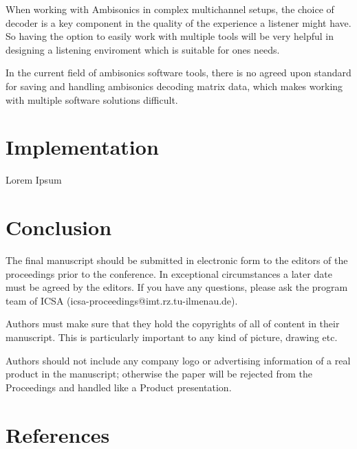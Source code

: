 \documentclass[a4paper, 10pt, twocolumn]{article}
\begin{document}
When working with Ambisonics in complex multichannel setups, the choice of decoder is a key component in the quality of the experience a listener might have. So having the option to easily work with multiple tools will be very helpful in designing a listening enviroment which is suitable for ones needs.

In the current field of ambisonics software tools, there is no agreed upon standard for saving and handling ambisonics decoding matrix data, which makes working with multiple software solutions difficult. 

\section{Implementation} \label{sec:Implementation}

Lorem Ipsum


\section{Conclusion }
The final manuscript should be submitted in electronic form to the editors of the proceedings prior to the conference. In exceptional circumstances a later date must be agreed by the editors. If you have any questions, please ask the program team of ICSA (icsa-proceedings@imt.rz.tu-ilmenau.de).

Authors must make sure that they hold the copyrights of all of content in their manuscript. This is particularly important to any kind of picture, drawing etc.

Authors should not include any company logo or advertising information of a real product in the manuscript; otherwise the paper will be rejected from the Proceedings and handled like a Product presentation. 

\renewcommand\refname{}
\section{References}

\begingroup
\RaggedRight 		%

\printbibliography
\endgroup
\end{document}

